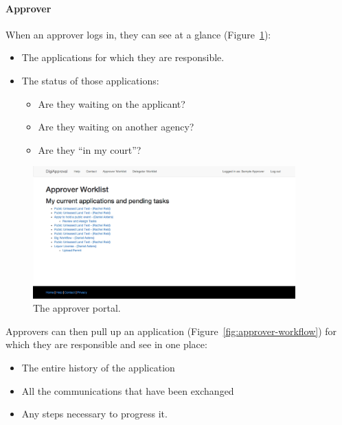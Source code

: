 \documentclass[12pt,a4paper,twosided]{article}
\begin{document}
\paragraph{Approver}

When an approver logs in, they can see at a glance (Figure~\ref{fig:approver-portal}):

\begin{itemize}

\item
  The applications for which they are responsible.
\item
  The status of those applications:

  \begin{itemize}
  
  \item
    Are they waiting on the applicant?
  \item
    Are they waiting on another agency?
  \item
    Are they ``in my court''?
  \end{itemize}
\end{itemize}

\begin{figure}[h!]
  \centering
  \includegraphics[width=0.9\textwidth]{approver-portal.png}
  \caption{The approver portal.}
  \label{fig:approver-portal}
\end{figure}

Approvers can then pull up an application (Figure~\ref{fig:approver-workflow}) for which they are
responsible and see in one place:

\begin{itemize}

\item
  The entire history of the application
\item
  All the communications that have been exchanged
\item
  Any steps necessary to progress it.
\end{itemize}
\end{document}
